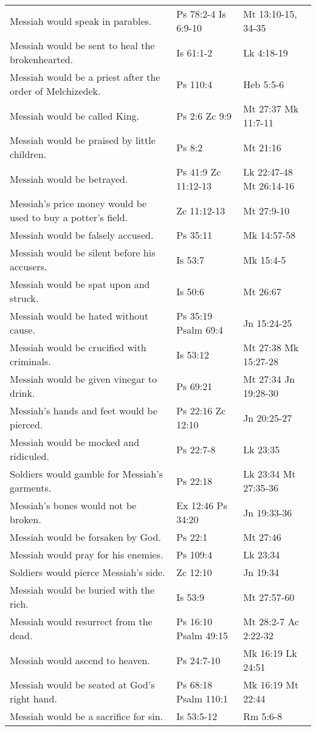 \documentclass[11pt]{article}
\begin{document}
\begin{center}
\begin{tabular}{lll}
Messiah would speak in parables. & Ps 78:2-4 Is 6:9-10 & Mt 13:10-15, 34-35\\[0pt]
Messiah would be sent to heal the brokenhearted. & Is 61:1-2 & Lk 4:18-19\\[0pt]
Messiah would be a priest after the order of Melchizedek. & Ps 110:4 & Heb 5:5-6\\[0pt]
Messiah would be called King. & Ps 2:6 Zc 9:9 & Mt 27:37 Mk 11:7-11\\[0pt]
Messiah would be praised by little children. & Ps 8:2 & Mt 21:16\\[0pt]
Messiah would be betrayed. & Ps 41:9 Zc 11:12-13 & Lk 22:47-48 Mt 26:14-16\\[0pt]
Messiah's price money would be used to buy a potter's field. & Zc 11:12-13 & Mt 27:9-10\\[0pt]
Messiah would be falsely accused. & Ps 35:11 & Mk 14:57-58\\[0pt]
Messiah would be silent before his accusers. & Is 53:7 & Mk 15:4-5\\[0pt]
Messiah would be spat upon and struck. & Is 50:6 & Mt 26:67\\[0pt]
Messiah would be hated without cause. & Ps 35:19 Psalm 69:4 & Jn 15:24-25\\[0pt]
Messiah would be crucified with criminals. & Is 53:12 & Mt 27:38 Mk 15:27-28\\[0pt]
Messiah would be given vinegar to drink. & Ps 69:21 & Mt 27:34 Jn 19:28-30\\[0pt]
Messiah's hands and feet would be pierced. & Ps 22:16 Zc 12:10 & Jn 20:25-27\\[0pt]
Messiah would be mocked and ridiculed. & Ps 22:7-8 & Lk 23:35\\[0pt]
Soldiers would gamble for Messiah's garments. & Ps 22:18 & Lk 23:34 Mt 27:35-36\\[0pt]
Messiah's bones would not be broken. & Ex 12:46 Ps 34:20 & Jn 19:33-36\\[0pt]
Messiah would be forsaken by God. & Ps 22:1 & Mt 27:46\\[0pt]
Messiah would pray for his enemies. & Ps 109:4 & Lk 23:34\\[0pt]
Soldiers would pierce Messiah's side. & Zc 12:10 & Jn 19:34\\[0pt]
Messiah would be buried with the rich. & Is 53:9 & Mt 27:57-60\\[0pt]
Messiah would resurrect from the dead. & Ps 16:10 Psalm 49:15 & Mt 28:2-7 Ac 2:22-32\\[0pt]
Messiah would ascend to heaven. & Ps 24:7-10 & Mk 16:19 Lk 24:51\\[0pt]
Messiah would be seated at God's right hand. & Ps 68:18 Psalm 110:1 & Mk 16:19 Mt 22:44\\[0pt]
Messiah would be a sacrifice for sin. & Is 53:5-12 & Rm 5:6-8\\[0pt]
\end{tabular}
\end{center}
\end{document}
